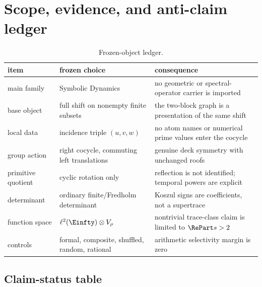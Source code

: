 \section{Scope, evidence, and anti-claim ledger}
\label{app:scope}

\begin{table}[ht]
\centering
\small
\begin{tabularx}{\textwidth}{L{0.22\textwidth}L{0.31\textwidth}X}
\toprule
item & frozen choice & consequence\\
\midrule
main family & Symbolic Dynamics & no geometric or spectral-operator carrier is imported\\
base object & full shift on nonempty finite subsets & the two-block graph is a presentation of the same shift\\
local data & incidence triple $(u,v,w)$ & no atom names or numerical prime values enter the cocycle\\
group action & right cocycle, commuting left translations & genuine deck symmetry with unchanged roofs\\
primitive quotient & cyclic rotation only & reflection is not identified; temporal powers are explicit\\
determinant & ordinary finite/Fredholm determinant & Koszul signs are coefficients, not a supertrace\\
function space & $\ell^2(\Einfty)\otimes V_\rho$ & nontrivial trace-class claim is limited to $\RePart s>2$\\
controls & formal, composite, shuffled, random, rational & arithmetic selectivity margin is zero\\
\bottomrule
\end{tabularx}
\caption{Frozen-object ledger.}
\end{table}

\subsection{Claim-status table}

